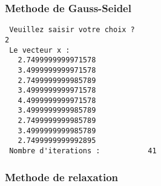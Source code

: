 \documentclass{report}
\begin{document}
\subsubsection{Methode de Gauss-Seidel}
\begin{small}
\begin{verbatim}
 Veuillez saisir votre choix ?
2
 Le vecteur x :
   2.7499999999971578     
   3.4999999999971578     
   2.7499999999985789     
   3.4999999999971578     
   4.4999999999971578     
   3.4999999999985789     
   2.7499999999985789     
   3.4999999999985789     
   2.7499999999992895     
 Nombre d'iterations :           41
\end{verbatim}
\end{small}

\subsubsection{Methode de relaxation}
\end{document}
